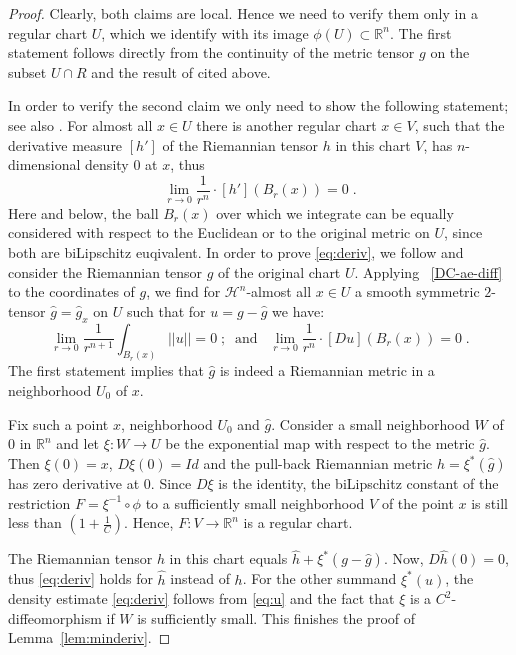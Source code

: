 \documentclass[12pt,leqno,intlimits]{amsart}
\numberwithin{equation}{section}
\theoremstyle{definition}
\theoremstyle{remark}
\newcommand{\lref}[1]{Lemma~\ref{#1}}
\newcommand{\R}{\mathbb{R}}
\def\:{\colon}
\begin{document}
\begin{proof}
Clearly, both claims are local. Hence we need to verify them only in a regular chart $U$, which we identify with its image $\phi (U) \subset \R^n$.   The first statement
follows directly from the continuity of the metric tensor $g$ on the subset $U\cap R$ and the result of \cite{Goffmann}
cited above.

In order to verify the second claim we only need to show the following statement;
see also \cite[Section 1.6]{Evans}.
For almost all $x\in U$ there is another
 regular chart $x\in V$, such that the derivative measure $[h']$ of  the Riemannian tensor $h$ in this  chart $V$, has $n$-dimensional density $0$
 at $x$, thus
 \begin{equation} \label{eq:deriv}
 \lim _{r\to 0}  \frac 1 {r^n} \cdot  {[h'] (B_r (x))}  =0 \;.
 \end{equation}
 Here and below, the ball $B_r (x)$ over which we integrate can be equally considered with respect to the Euclidean or to the original metric on $U$, since both are biLipschitz euqivalent.
 In order to prove \eqref{eq:deriv},   we follow \cite[Section 4.2]{Per-DC} and consider the Riemannian tensor $g$ of the original chart $U$.  Applying  ~\eqref{DC-ae-diff}  to  the coordinates of $g$, we find for $\mathcal H^n$-almost all
 $x\in U$  a  smooth symmetric $2$-tensor  $\hat g =\hat g_x$ on  $U$ such that  for
 $u=g-\hat g$  we have:
 \begin{equation} \label{eq:u}
 \lim_{r\to 0}\frac 1 {r^{n+1}}  \int _{B_r(x)} ||u|| =0 \; ;\; \;  \text{and} \;  \; \;
  \lim _{r\to 0}  \frac 1 {r^n} \cdot   [Du] (B_r (x)) =0 \; .
  \end{equation}
The first statement implies that $\hat g$ is indeed a Riemannian metric in a neighborhood $U_0$ of $x$.


Fix such a point $x$,  neighborhood $U_0$ and $\hat g$.
Consider a small neighborhood $W$ of $0$ in $\R^n$ and let $\xi \:W\to U$ be the exponential map with respect to the metric
$\hat g$. Then $\xi (0)=x$, $D\xi  (0) =Id$  and  the  pull-back Riemannian metric $\hat h= \xi^{\ast}  (\hat g)$  has zero derivative at $0$.    Since $D\xi$ is the identity, the biLipschitz constant of the restriction $F=\xi ^{-1} \circ \phi$ to a sufficiently
small neighborhood $V$ of the point $x$ is still less than $(1 + \frac 1 C)$.
Hence, $F\:V\to \R^n$ is a regular chart.

The Riemannian tensor $h$ in this chart equals $\hat h  +\xi^{\ast } (g-\hat g)$.
Now, $D\hat h (0) =0$, thus
\eqref{eq:deriv} holds for $\hat h$ instead of $h$.  For the other summand  $\xi ^{\ast} (u)$, the density estimate
\eqref{eq:deriv} follows from \eqref{eq:u} and  the fact that $\xi$ is a $C^2$-diffeomorphism
 if $W$ is sufficiently small.   This finishes the proof of \lref{lem:minderiv}.
\end{proof}
\end{document}
